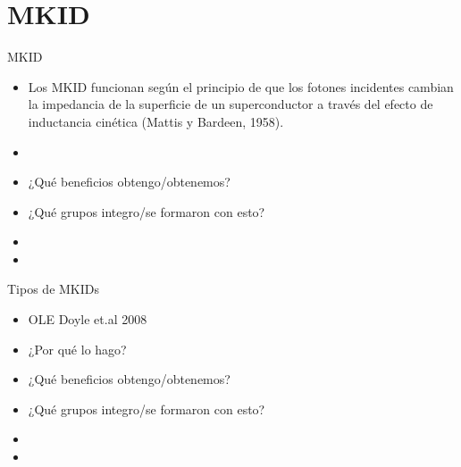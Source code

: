 \documentclass[ignorenonframetext,12pt]{beamer}
\begin{document}
\section{MKID}
\begin{frame}{MKID}
				\begin{itemize}
								\item Los MKID funcionan según el principio de que los fotones
												incidentes \alert{cambian la impedancia de la superficie de un
												superconductor a través del efecto de inductancia
												cinética} (Mattis y Bardeen, 1958).
								\item 
								\item ¿Qué beneficios obtengo/obtenemos?
								\item ¿Qué grupos integro/se formaron con esto?
								\item 
								\item 
				\end{itemize}

\end{frame}

\begin{frame}{Tipos de MKIDs}
				\begin{itemize}
								\item OLE Doyle et.al 2008
								\item ¿Por qué lo hago?
								\item ¿Qué beneficios obtengo/obtenemos?
								\item ¿Qué grupos integro/se formaron con esto?
								\item 
								\item 
				\end{itemize}

\end{frame}

\end{document}
